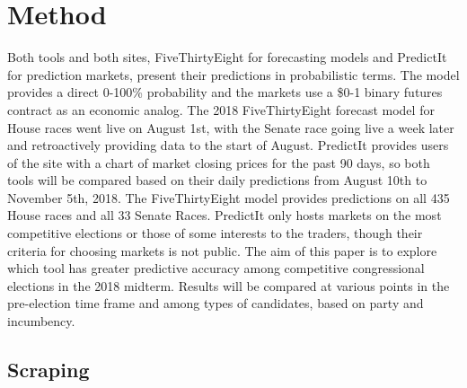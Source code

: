 \documentclass[]{article}
\begin{document}
\section{Method}\label{method}

Both tools and both sites, FiveThirtyEight for forecasting models and
PredictIt for prediction markets, present their predictions in
probabilistic terms. The model provides a direct 0-100\% probability and
the markets use a \$0-1 binary futures contract as an economic analog.
The 2018 FiveThirtyEight forecast model for House races went live on
August 1st, with the Senate race going live a week later and
retroactively providing data to the start of August. PredictIt provides
users of the site with a chart of market closing prices for the past 90
days, so both tools will be compared based on their daily predictions
from August 10th to November 5th, 2018. The FiveThirtyEight model
provides predictions on all 435 House races and all 33 Senate Races.
PredictIt only hosts markets on the most competitive elections or those
of some interests to the traders, though their criteria for choosing
markets is not public. The aim of this paper is to explore which tool
has greater predictive accuracy among competitive congressional
elections in the 2018 midterm. Results will be compared at various
points in the pre-election time frame and among types of candidates,
based on party and incumbency.

\subsection{Scraping}\label{scraping}
\end{document}
